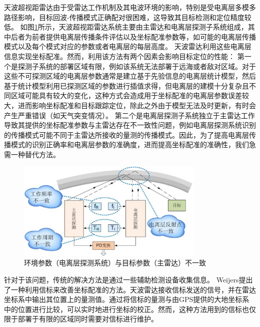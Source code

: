 天波超视距雷达由于受雷达工作机制及其电波环境的影响，特别是受电离层多模多路径影响，目标回波-传播模式正确配对很困难，这导致其目标检测和定位精度较低。
如图\ref{fig:pdproblem}所示，天波超视距雷达系统主要由主雷达和电离层探测子系统组成，其中后者为前者提供电离层传播条件评估以及坐标配准参数等，如可能的电离层传播模式以及每个模式对应的参数或者电离层的每层高度。
天波雷达利用这些电离层信息实现坐标配准。然而，利用该方法有两个因素会影响目标定位的性能：
第一个是探测子系统的部署区域有限，例如该系统无法部署于远海或者敌对区域。对于这些不可探测区域的电离层参数通常是建立基于先验信息的电离层统计模型，然后基于统计模型利用已探测区域的参数进行插值求得，但电离层的建模十分复杂且不同区域可能具有较大的变化，这种方式会造成用于坐标配准的电离层参数误差较大，进而影响坐标配准和目标跟踪定位，除此之外由于模型无法及时更新，有时会产生严重错误（如天气突变情况）。
第二个是电离层探测子系统独立于主雷达工作导致其提供的坐标配准参数与主雷达存在不一致性问题，例如电离层探测系统识别的传播模式可能不同于主雷达所接收的量测的传播模式。因此，为了提高电离层传播模式的识别正确率和电离层参数的准确度，进而提高坐标配准的准确性，我们急需一种替代方法。

\begin{figure}[hbt]
	\centering
	\includegraphics[width=9cm]{figures/introduction/pdproblem}
	\caption{环境参数（电离层探测系统）与目标参数（主雷达）不一致}
	\label{fig:pdproblem}
\end{figure}

针对于该问题，传统的解决方法是通过一些辅助检测设备收集信息。
Weijers提出了一种利用信标来改善坐标配准的方法。天波雷达接收信标发送的信号，并在雷达坐标系中输出其位置上的量测值。通过将信标的量测与由GPS提供的大地坐标系中的位置进行比较，可以实时地进行坐标的校正。然而，这种方法用到的信标也仅限于部署于有限的区域同时需要对信标进行维护。

